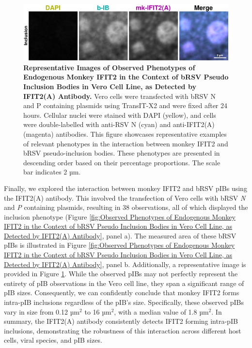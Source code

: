 \begin{figure}
    \centering
    \includegraphics[width=1\linewidth]{09. Chapter 4/Figs/01. pIB/03. IFIT2/02. IFIT2A/09. i2a-vero-bnbp.pdf} 
    \caption[Representative Images of Observed Phenotypes of Endogenous Monkey IFIT2 in the Context of bRSV Pseudo Inclusion Bodies in Vero Cell Line, as Detected by IFIT2(A) Antibody.]{\textbf{Representative Images of Observed Phenotypes of Endogenous Monkey IFIT2 in the Context of bRSV Pseudo Inclusion Bodies in Vero Cell Line, as Detected by IFIT2(A) Antibody.} Vero cells were transfected with bRSV N and P containing plasmids using TransIT-X2 and were fixed after 24 hours. Cellular nuclei were stained with DAPI (yellow), and cells were double-labelled with anti-RSV N (cyan) and anti-IFIT2(A) (magenta) antibodies. This figure showcases representative examples of relevant phenotypes in the interaction between monkey IFIT2 and bRSV pseudo-inclusion bodies. These phenotypes are presented in descending order based on their percentage proportions. The scale bar indicates 2 µm.}
    \label{fig:Representative Images of Observed Phenotypes of Endogenous Monkey IFIT2 in the Context of bRSV Pseudo Inclusion Bodies in Vero Cell Line, as Detected by IFIT2(A) Antibody}
\end{figure}

Finally, we explored the interaction between monkey IFIT2 and bRSV pIBs using the IFIT2(A) antibody. This involved the transfection of Vero cells with bRSV \textit{N} and \textit{P} containing plasmids, resulting in 38 observations, all of which displayed the inclusion phenotype (Figure \ref{fig:Observed Phenotypes of Endogenous Monkey IFIT2 in the Context of bRSV Pseudo Inclusion Bodies in Vero Cell Line, as Detected by IFIT2(A) Antibody}, panel a). The measured area of these bRSV pIBs is illustrated in Figure \ref{fig:Observed Phenotypes of Endogenous Monkey IFIT2 in the Context of bRSV Pseudo Inclusion Bodies in Vero Cell Line, as Detected by IFIT2(A) Antibody}, panel b. Additionally, a representative image is provided in Figure \ref{fig:Representative Images of Observed Phenotypes of Endogenous Monkey IFIT2 in the Context of bRSV Pseudo Inclusion Bodies in Vero Cell Line, as Detected by IFIT2(A) Antibody}. While the observed pIBs may not perfectly represent the entirety of pIB observations in the Vero cell line, they span a significant range of pIB sizes. Consequently, we can confidently conclude that monkey IFIT2 forms intra-pIB inclusions regardless of the pIB's size. Specifically, these observed pIBs vary in size from 0.12 \(\mbox{µm}^2\) to 16 \(\mbox{µm}^2\), with a median value of 1.8 \(\mbox{µm}^2\). In summary, the IFIT2(A) antibody consistently detects IFIT2 forming intra-pIB inclusions, demonstrating the robustness of this interaction across different host cells, viral species, and pIB sizes.

